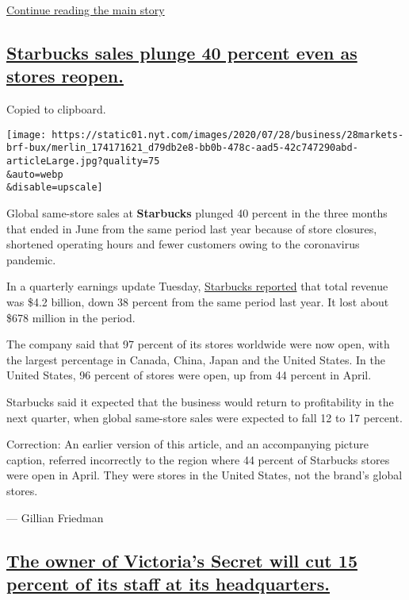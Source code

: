 \protect\hyperlink{after-dfp-ad-mid1}{Continue reading the main story}

\hypertarget{starbucks-sales-plunge-40-percent-even-as-stores-reopen}{%
\subsection{\texorpdfstring{\protect\hyperlink{starbucks-sales-plunge-40-percent-even-as-stores-reopen}{Starbucks
sales plunge 40 percent even as stores
reopen.}}{Starbucks sales plunge 40 percent even as stores reopen.}}\label{starbucks-sales-plunge-40-percent-even-as-stores-reopen}}

Copied to clipboard.

\texttt{[image: https://static01.nyt.com/images/2020/07/28/business/28markets-brf-bux/merlin\_174171621\_d79db2e8-bb0b-478c-aad5-42c747290abd-articleLarge.jpg?quality=75\\\&auto=webp\\\&disable=upscale]}

Global same-store sales at \textbf{Starbucks} plunged 40 percent in the
three months that ended in June from the same period last year because
of store closures, shortened operating hours and fewer customers owing
to the coronavirus pandemic.

In a quarterly earnings update Tuesday,
\href{https://investor.starbucks.com/press-releases/financial-releases/press-release-details/2020/Starbucks-Reports-Q3-Fiscal-2020-Results/default.aspx}{Starbucks
reported} that total revenue was \$4.2 billion, down 38 percent from the
same period last year. It lost about \$678 million in the period.

The company said that 97 percent of its stores worldwide were now open,
with the largest percentage in Canada, China, Japan and the United
States. In the United States, 96 percent of stores were open, up from 44
percent in April.

Starbucks said it expected that the business would return to
profitability in the next quarter, when global same-store sales were
expected to fall 12 to 17 percent.

Correction: An earlier version of this article, and an accompanying
picture caption, referred incorrectly to the region where 44 percent of
Starbucks stores were open in April. They were stores in the United
States, not the brand's global stores.

--- Gillian Friedman

\hypertarget{the-owner-of-victorias-secret-will-cut-15-percent-of-its-staff-at-its-headquarters}{%
\subsection{\texorpdfstring{\protect\hyperlink{the-owner-of-victorias-secret-will-cut-15-percent-of-its-staff-at-its-headquarters}{The
owner of Victoria's Secret will cut 15 percent of its staff at its
headquarters.}}{The owner of Victoria's Secret will cut 15 percent of its staff at its headquarters.}}\label{the-owner-of-victorias-secret-will-cut-15-percent-of-its-staff-at-its-headquarters}}

